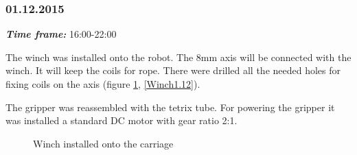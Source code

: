 \subsubsection{01.12.2015}
\textit{\textbf{Time frame:}} 16:00-22:00

The winch was installed onto the robot. The 8mm axis will be connected with the winch. It will keep the coils for rope. There were drilled all the needed holes for fixing coils on the axis (figure \ref{Winch1.11}, \ref{Winch1.12}).

The gripper was reassembled with the tetrix tube. For powering the gripper it was installed a standard DC motor with gear ratio 2:1.

\begin{figure}[H]
	\begin{minipage}[h]{0.58\linewidth}
		\caption{Winch installed onto the carriage}
		\label{Winch1.11}
	\end{minipage}
	\hfill
	\begin{minipage}[h]{0.37\linewidth}

\end{minipage}
\end{figure}

